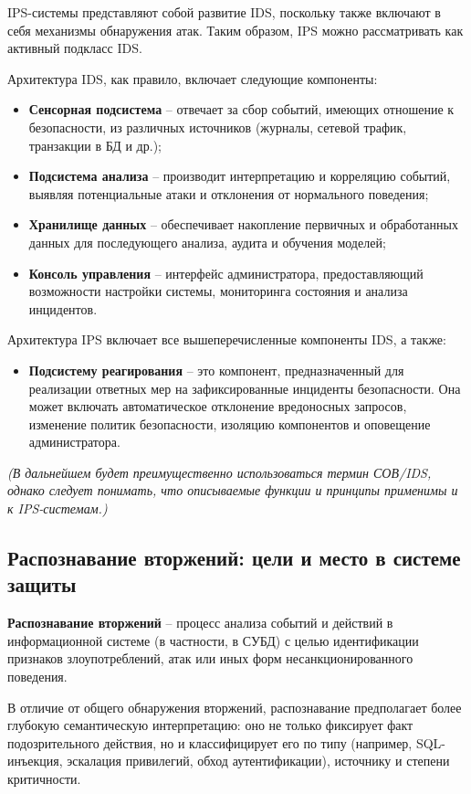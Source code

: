 IPS-системы представляют собой развитие IDS, поскольку также включают в себя механизмы обнаружения атак. Таким образом, IPS можно рассматривать как активный подкласс IDS.

Архитектура IDS, как правило, включает следующие компоненты:
\begin{itemize}
    \item \textbf{Сенсорная подсистема} -- отвечает за сбор событий, имеющих отношение к безопасности, из различных источников (журналы, сетевой трафик, транзакции в БД и др.);
    \item \textbf{Подсистема анализа} -- производит интерпретацию и корреляцию событий, выявляя потенциальные атаки и отклонения от нормального поведения;
    \item \textbf{Хранилище данных} -- обеспечивает накопление первичных и обработанных данных для последующего анализа, аудита и обучения моделей;
    \item \textbf{Консоль управления} -- интерфейс администратора, предоставляющий возможности настройки системы, мониторинга состояния и анализа инцидентов.
\end{itemize}

Архитектура IPS включает все вышеперечисленные компоненты IDS, а также:
\begin{itemize}
    \item \textbf{Подсистему реагирования} -- это компонент, предназначенный для реализации ответных мер на зафиксированные инциденты безопасности. Она может включать автоматическое отклонение вредоносных запросов, изменение политик безопасности, изоляцию компонентов и оповещение администратора. \cite{debar}
\end{itemize}

\textit{(В дальнейшем будет преимущественно использоваться термин СОВ/IDS, однако следует понимать, что описываемые функции и принципы применимы и к IPS-системам.)}

\subsection{Распознавание вторжений: цели и место в системе защиты}

\textbf{Распознавание вторжений} -- процесс анализа событий и действий в информационной системе (в частности, в СУБД) с целью идентификации признаков злоупотреблений, атак или иных форм несанкционированного поведения.

В отличие от общего обнаружения вторжений, распознавание предполагает более глубокую семантическую интерпретацию: оно не только фиксирует факт подозрительного действия, но и классифицирует его по типу (например, SQL-инъекция, эскалация привилегий, обход аутентификации), источнику и степени критичности.

